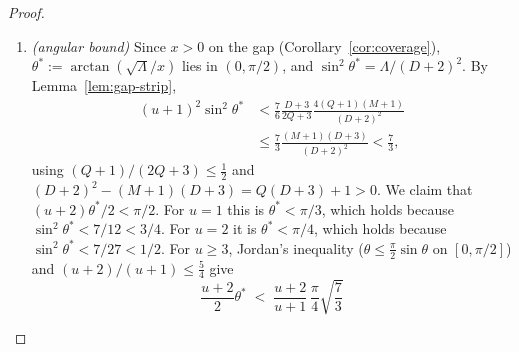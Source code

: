 \documentclass[twoside,10pt]{article}
\numberwithin{equation}{section}
\theoremstyle{slbody}
\theoremstyle{definition}
\theoremstyle{remark}
\numberwithin{theorem}{section}
\begin{document}
\begin{proof}
\begin{enumerate}
\[    \qquad \kappa_j=\frac{D-j}{j+2}\ (\le 1\ \text{above the center});
  \]
  the map is increasing in $\zeta$ on $[0,x)$ and in $\kappa$, and the
  $\kappa=1$ map is exactly the tangent addition formula:
  \[
    F\bigl(\sqrt\Lambda\,\tan a\bigr) \;=\; \sqrt\Lambda\,\tan(a+\theta^*),
    \qquad \tan\theta^* \;=\; \frac{\sqrt\Lambda}{x} .
  \]
  Reflection supplies the initial values ($Q$ even here, $p_{D-j}=p_j$).
  For $D$ even,
  $d_c=0$ at $c=D/2$ (the rank-one relation of Theorem~\ref{thm:center}),
  so $\zeta_c=0$; here $p_c\ne0$ by Theorem~\ref{thm:center}.  For $D$ odd,
  $p_{c+1}=p_c\ne0$ at
  $c=(D-1)/2$ gives, in one step,
  \[
    \zeta_{c+1} \;=\; \kappa_c\,(D+2-x)
    \;=\; \kappa_c\,\sqrt\Lambda\,\tan(\theta^*/2)
  \]
  where $\tan(\theta^*/2)=\sqrt\Lambda/(D+2+x)$.  Comparison with the
  majorant from the tangent addition formula then gives
  \[
    \zeta_{c+\ell} \;\le\;
    \sqrt\Lambda\,\tan\bigl((\ell-\delta/2)\,\theta^*\bigr),
    \qquad \delta=D\bmod 2,
  \]
  as long as the argument stays below $\pi/2$.  More precisely, the path is
  $j=c,c+1,\ldots,s$ when $D$ is even and
  $j=c+1,c+2,\ldots,s$ when $D$ is odd.  On this path the induction
  invariant is
  \[
   p_j\ne0,\qquad
   0\le\zeta_j\le
   \sqrt\Lambda\tan\bigl((j-D/2)\theta^*\bigr)<x.
  \]
  The displayed anchors establish its base case.  If it holds at $j$, then
  $x-\zeta_j>0$, so the $(p,d)$ system makes $p_{j+1}$ nonzero with the
  same sign as $p_j$; monotonicity of the comparison map gives the next
  upper bound, while its positive numerator gives $\zeta_{j+1}\ge0$.
\item \emph{(angular bound)}  Since $x>0$ on the gap
  (Corollary~\ref{cor:coverage}), $\theta^*:=\arctan(\sqrt\Lambda/x)$ lies
  in $(0,\pi/2)$, and $\sin^2\theta^*=\Lambda/(D+2)^2$.  By
  Lemma~\ref{lem:gap-strip},
  \[
  \begin{split}
   (u+1)^2\sin^2\theta^*
   &< \frac76\frac{D+3}{2Q+3}
       \frac{4(Q+1)(M+1)}{(D+2)^2}\\
   &\le \frac73\frac{(M+1)(D+3)}{(D+2)^2}<\frac73,
  \end{split}
  \]
  using $(Q+1)/(2Q+3)\le\tfrac12$ and
  $(D+2)^2-(M+1)(D+3)=Q(D+3)+1>0$.  We claim that
  $(u+2)\theta^*/2<\pi/2$.  For $u=1$ this is $\theta^*<\pi/3$, which
  holds because $\sin^2\theta^*<7/12<3/4$.  For $u=2$ it is
  $\theta^*<\pi/4$, which holds because $\sin^2\theta^*<7/27<1/2$.  For
  $u\ge3$, Jordan's inequality ($\theta\le\tfrac\pi2\sin\theta$ on
  $[0,\pi/2]$) and $(u+2)/(u+1)\le\tfrac54$ give
  \[
    \frac{u+2}{2}\theta^*
    \;<\; \frac{u+2}{u+1}\,\frac\pi4\sqrt{\frac73}
\]
\end{enumerate}
\end{proof}
\end{document}
